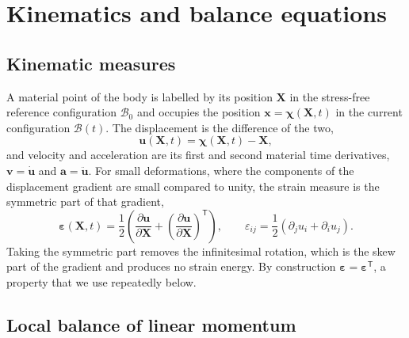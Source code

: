 \documentclass[11pt,a4paper]{article}
\numberwithin{equation}{section}
\theoremstyle{remark}
\newcommand{\bu}{\bm{u}}
\newcommand{\bx}{\bm{x}}
\newcommand{\bX}{\bm{X}}
\newcommand{\bv}{\bm{v}}
\newcommand{\beps}{\bm{\varepsilon}}
\begin{document}
\section{Kinematics and balance equations}\label{sec:balance}

\subsection{Kinematic measures}\label{sec:kinematics}

A material point of the body is labelled by its position $\bX$ in the stress-free
reference configuration $\mathcal{B}_0$ and occupies the position
$\bx = \bm{\chi}(\bX,t)$ in the current configuration $\mathcal{B}(t)$. The displacement
is the difference of the two,
\begin{equation}\label{eq:displacement}
  \bu(\bX,t) = \bm{\chi}(\bX,t) - \bX,
\end{equation}
and velocity and acceleration are its first and second material time derivatives,
$\bv = \dot{\bu}$ and $\bm{a} = \ddot{\bu}$. For small deformations, where the components
of the displacement gradient are small compared to unity, the strain measure is the
symmetric part of that gradient,
\begin{equation}\label{eq:strain}
  \beps(\bX,t) = \frac{1}{2}\left(
    \frac{\partial \bu}{\partial \bX} + \left(\frac{\partial \bu}{\partial \bX}\right)^{\mathsf{T}}
  \right),
  \qquad
  \varepsilon_{ij} = \frac{1}{2}\left(\partial_j u_i + \partial_i u_j\right).
\end{equation}
Taking the symmetric part removes the infinitesimal rotation, which is the skew part of
the gradient and produces no strain energy. By construction $\beps = \beps^{\mathsf{T}}$,
a property that we use repeatedly below.

\subsection{Local balance of linear momentum}\label{sec:localbalance}
\end{document}
